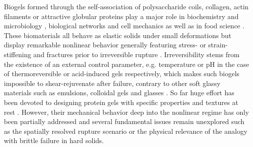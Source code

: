\documentclass[twocolumn,superscriptaddress,showpacs,preprintnumbers,amsmath,amssymb,prl]{revtex4}
\begin{document}

Biogels formed through the self-association of polysaccharide coils, collagen, actin filaments or attractive globular proteins play a major role in biochemistry and microbiology \cite{Viovy:2000}, biological networks and cell mechanics \cite{Stricker:2010} as well as in food science \cite{Mezzenga:2005}. These biomaterials all behave as elastic solids under small deformations but display remarkable nonlinear behavior generally featuring stress- or strain-stiffening \cite{Gardel:2004} and fractures prior to irreversible rupture \cite{Bonn:1998,Baumberger:2006}. Irreversibility stems from the existence of an external control parameter, e.g. temperature or pH in the case of thermoreversible or acid-induced gels respectively, which makes such biogels impossible to shear-rejuvenate after failure, contrary to other soft glassy materials such as emulsions, colloidal gels and glasses \cite{Cloitre:2000,Divoux:2012,Siebenburger:2012}. So far huge effort has been devoted to designing protein gels with specific properties and textures at rest \cite{Dickinson:2006,Gibaud:2012}. However, their mechanical behavior deep into the nonlinear regime has only been partially addressed \cite{vanVliet:1995,Pouzot:2006} and several fundamental issues remain unexplored such as the spatially resolved rupture scenario or the physical relevance of the analogy with brittle failure in hard solids.
\end{document}
